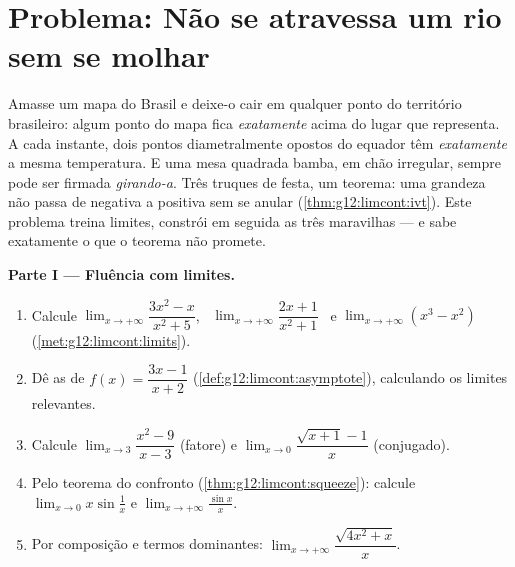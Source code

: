 \section{Problema: Não se atravessa um rio sem se molhar}

\begin{problem}
\label{pb:g12:limcont:1}
Amasse um mapa do Brasil e deixe-o cair em qualquer ponto do
território brasileiro: algum ponto do mapa fica \emph{exatamente}
acima do lugar que representa. A cada instante, dois pontos
diametralmente opostos do equador têm \emph{exatamente} a mesma
temperatura. E uma mesa quadrada bamba, em chão irregular, sempre
pode ser firmada \emph{girando-a}. Três truques de festa, um
teorema: uma grandeza  não passa de negativa a positiva
sem se anular (\cref{thm:g12:limcont:ivt}). Este problema treina
limites, constrói em seguida as três maravilhas --- e sabe
exatamente o que o teorema não promete.

\medskip
\noindent\textbf{Parte I --- Fluência com limites.}
\begin{enumerate}
  \item Calcule $\lim_{x \to +\infty} \dfrac{3x^2 - x}{x^2 + 5}$,
        \ $\lim_{x \to +\infty} \dfrac{2x + 1}{x^2 + 1}$ \ e
        $\lim_{x \to +\infty} (x^3 - x^2)$
        (\cref{met:g12:limcont:limits}).
  \item Dê as  de $f(x) = \dfrac{3x - 1}{x + 2}$
        (\cref{def:g12:limcont:asymptote}), calculando os limites
        relevantes.
  \item Calcule $\lim_{x \to 3} \dfrac{x^2 - 9}{x - 3}$ (fatore)
        e $\lim_{x \to 0} \dfrac{\sqrt{x + 1} - 1}{x}$
        (conjugado).
  \item Pelo teorema do confronto
        (\cref{thm:g12:limcont:squeeze}): calcule
        $\lim_{x \to 0} x \sin\frac1x$ e
        $\lim_{x \to +\infty} \frac{\sin x}{x}$.
  \item Por composição e termos dominantes:
        $\lim_{x \to +\infty} \dfrac{\sqrt{4x^2 + x}}{x}$.
\end{enumerate}


\end{problem}
